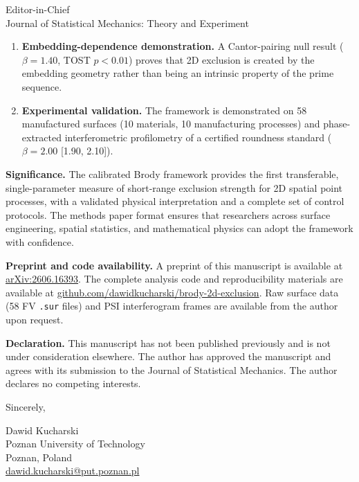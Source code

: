 \documentclass{letter}
\begin{document}
\begin{letter}{Editor-in-Chief \\
Journal of Statistical Mechanics: Theory and Experiment}
\begin{enumerate}
  \item \textbf{Embedding-dependence demonstration.} A Cantor-pairing null
  result ($\beta=1.40$, TOST $p<0.01$) proves that 2D exclusion is created
  by the embedding geometry rather than being an intrinsic property of the
  prime sequence.

  \item \textbf{Experimental validation.} The framework is demonstrated on
  58 manufactured surfaces (10 materials, 10 manufacturing processes) and
  phase-extracted interferometric profilometry of a certified roundness
  standard ($\beta=2.00$ [1.90, 2.10]).
\end{enumerate}

\textbf{Significance.} The calibrated Brody framework provides the first
transferable, single-parameter measure of short-range exclusion strength
for 2D spatial point processes, with a validated physical interpretation
and a complete set of control protocols. The methods paper format ensures
that researchers across surface engineering, spatial statistics, and
mathematical physics can adopt the framework with confidence.

\textbf{Preprint and code availability.} A preprint of this manuscript is
available at \href{https://arxiv.org/abs/2606.16393}{arXiv:2606.16393}.
The complete analysis code and reproducibility materials are available at
\href{https://github.com/dawidkucharski/brody-2d-exclusion}{github.com/dawidkucharski/brody-2d-exclusion}.
Raw surface data (58 FV \texttt{.sur} files) and PSI interferogram frames are
available from the author upon request.

\textbf{Declaration.} This manuscript has not been published previously and
is not under consideration elsewhere. The author has approved the
manuscript and agrees with its submission to the Journal of Statistical Mechanics.
The author declares no competing interests.

\closing{Sincerely,}
Dawid Kucharski \\
Poznan University of Technology \\
Poznan, Poland \\
\href{mailto:dawid.kucharski@put.poznan.pl}{dawid.kucharski@put.poznan.pl}

\end{letter}
\end{document}

